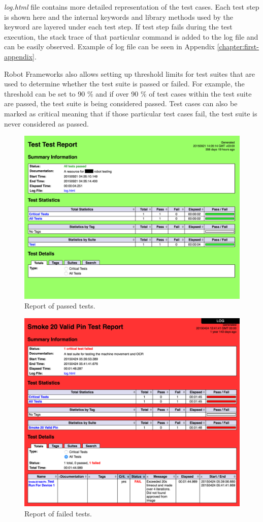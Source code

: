 \emph{log.html} file contains more detailed representation of the test cases. Each test step is shown here and the internal keywords and library methods used by the keyword are layered under each test step. If test step fails during the test execution, the stack trace of that particular command is added to the log file and can be easily observed. Example of log file can be seen in Appendix \ref{chapter:first-appendix}.

Robot Frameworks also allows setting up threshold limits for test suites that are used to determine whether the test suite is passed or failed. For example, the threshold can be set to 90 \% and if over 90 \% of test cases within the test suite are passed, the test suite is being considered passed. Test cases can also be marked as critical meaning that if those particular test cases fail, the test suite is never considered as passed.

\begin{figure}[ht]
  \begin{center}
    \includegraphics[width=.8\textwidth]{images/passed_report.png}
    \caption{Report of passed tests.}
    \label{fig:passed report}
  \end{center}
\end{figure}
\FloatBarrier

\begin{figure}[ht]
  \begin{center}
    \includegraphics[width=.8\textwidth]{images/failed_report.png}
    \caption{Report of failed tests.}
    \label{fig:failed report}
  \end{center}
\end{figure}
\FloatBarrier